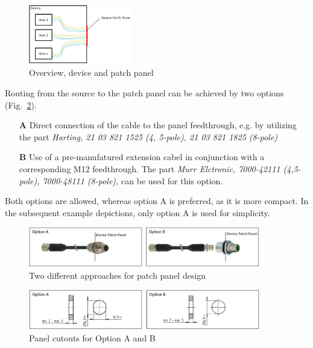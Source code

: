 \begin{figure}[H]
\centering
\includegraphics[width=0.4\textwidth]{Figures/DevicePatchPanel.jpg}
\caption{\label{fig:DevicePatchPanel}Overview, device and patch panel}
\end{figure}


Routing from the source to the patch panel can be achieved by two options (Fig.~\ref{fig:PatchingOptions}).
\begin{itemize}
    \item[\bf A] Direct connection of the cable to the panel feedthrough, e.g. by utilizing the part \emph{Harting, 21 03 821 1525 (4, 5-pole), 21 03 821 1825 (8-pole)}
    \item[\bf B] Use of a pre-manufatured extension cabel in conjunction with a corresponding M12 feedthrough. The part \emph{Murr Elctronic, 7000-42111 (4,5-pole), 7000-48111 (8-pole), } can be used for this option.
\end{itemize}
Both options are allowed, whereas option A is preferred, as it is more compact.
In the subsequent example depictions, only option A is used for simplicity.

\begin{figure}[H]
\centering
\includegraphics[width=0.9\textwidth]{Figures/PatchingOptions.jpg}
\caption{\label{fig:PatchingOptions}Two different approaches for patch panel design}
\end{figure}


\begin{figure}[H]
\centering
\includegraphics[width=0.9\textwidth]{Figures/PanelCutOut.jpg}
\caption{\label{fig:PanelCutOut}Panel cutouts for Option A and B}
\end{figure}

